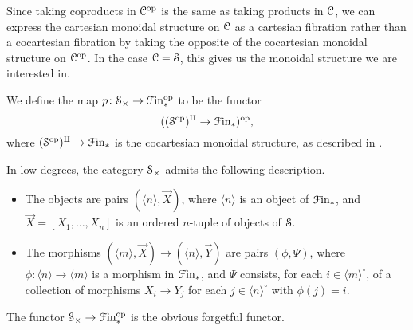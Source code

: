 \documentclass[main.tex]{subfiles}
\begin{document}
Since taking coproducts in $\category{C}\op$ is the same as taking products in $\category{C}$, we can express the cartesian monoidal structure on $\category{C}$ as a cartesian fibration rather than a cocartesian fibration by taking the opposite of the cocartesian monoidal structure on $\category{C}\op$. In the case $\category{C} = \S$, this gives us the monoidal structure we are interested in.

\begin{definition}
  We define the map $p\colon \S_{\times} \to \Finp\op$ to be the functor
  \begin{equation*}
    ((\S\op)^{\amalg} \to \Finp)\op,
  \end{equation*}
  where $(\S\op)^{\amalg} \to \Finp$ is the cocartesian monoidal structure, as described in \cite[Sec.\ 2.4.2]{luriehigheralgebra}.
\end{definition}

In low degrees, the category $\S_{\times}$ admits the following description.
\begin{itemize}
  \item The objects are pairs $(\langle n \rangle, \vec{X})$, where $\langle n \rangle$ is an object of $\Finp$, and $\vec{X} = [X_{1}, \ldots, X_{n}]$ is an ordered $n$-tuple of objects of $\S$.

  \item The morphisms $(\langle m \rangle, \vec{X}) \to (\langle n \rangle, \vec{Y})$ are pairs $(\phi, \Psi)$, where $\phi\colon \langle n \rangle \to \langle m \rangle$ is a morphism in $\Finp$, and $\Psi$ consists, for each $i \in \langle m \rangle^{\circ}$, of a collection of morphisms $X_{i} \to Y_{j}$ for each $j \in \langle n \rangle^{\circ}$ with $\phi(j) = i$.
\end{itemize}

The functor $\S_{\times} \to \Finp\op$ is the obvious forgetful functor.
\end{document}
